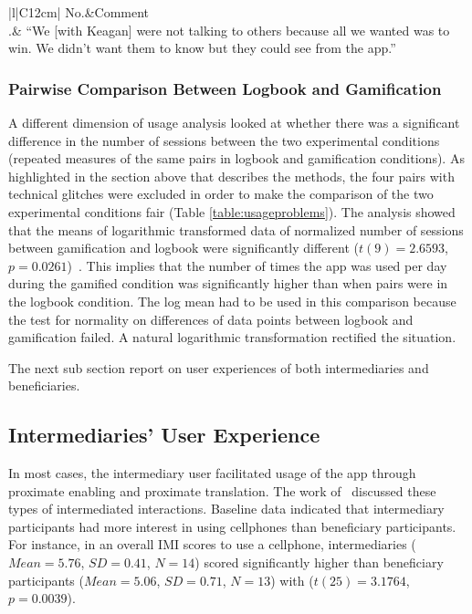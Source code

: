 \begin{table}[h!]
\renewcommand{\baselinestretch}{1.5}
  \begin{center}
    \caption{Excerpt: an example of introjected regulation.}
    \label{table:introject_reg}
	\begin{tabular}{|l|C{12cm}|}
		\hline
		No.&Comment\\
		.& {``We [with Keagan] were not talking to others because all we wanted was to win. We didn't want them to know but they could see from the app.''}~\citep{katule2016family}\\
		\hline
	\end{tabular}
  \end{center}
\end{table} 

\subsubsection*{Pairwise Comparison Between Logbook and Gamification}
A different dimension of usage analysis looked at whether there was a significant difference in the number of sessions between the two experimental conditions (repeated measures of the same pairs in logbook and gamification conditions). As highlighted in the section above that describes the methods, the four pairs with technical glitches were excluded in order to make the comparison of the two experimental conditions fair (Table \ref{table:usageproblems}). The analysis showed that the means of logarithmic transformed data of normalized number of sessions between gamification and logbook were significantly different ($t(9)=2.6593$, $p=0.0261$)~\citep{katule2016family}. This implies that the number of times the app was used per day during the gamified condition was significantly higher than when pairs were in the logbook condition. The log mean had to be used in this comparison because the test for normality on differences of data points between logbook and gamification failed. A natural logarithmic transformation rectified the situation.

The next sub section report on user experiences of both intermediaries and beneficiaries.
\subsection{Intermediaries' User Experience}\label{interm_user_xp}
In most cases, the intermediary user facilitated usage of the app through proximate enabling and proximate translation. The work of~\cite{sambasivan2010} discussed these types of intermediated interactions. Baseline data indicated that intermediary participants had more interest in using cellphones than beneficiary participants. For instance, in an overall IMI scores to use a cellphone, intermediaries ($Mean=5.76$, $SD=0.41$, $N=14$) scored  significantly higher than beneficiary participants ($Mean=5.06$, $SD= 0.71$, $N=13$) with ($t(25)=3.1764$, $p=0.0039$).

